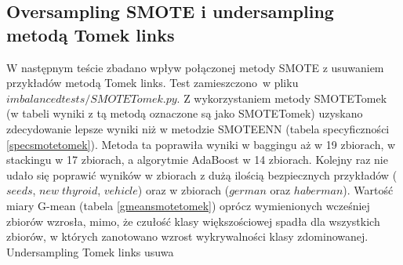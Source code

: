 \subsection{Oversampling SMOTE i undersampling metodą Tomek links}
W następnym teście zbadano wpływ połączonej metody SMOTE z usuwaniem przykładów metodą Tomek links. Test zamieszczono w pliku $imbalancedtests/SMOTETomek.py$. Z wykorzystaniem metody SMOTETomek (w tabeli wyniki z tą metodą oznaczone są jako SMOTETomek) uzyskano zdecydowanie lepsze wyniki niż w metodzie SMOTEENN (tabela specyficzności \ref{specsmotetomek}). Metoda ta poprawiła wyniki w baggingu aż w 19 zbiorach, w stackingu w 17 zbiorach, a algorytmie AdaBoost w 14 zbiorach. Kolejny raz nie udało się poprawić wyników w zbiorach z dużą ilością bezpiecznych przykładów ($seeds$, $new\; thyroid$, $vehicle$) oraz w zbiorach ($german$ oraz $haberman$). Wartość miary G-mean (tabela \ref{gmeansmotetomek}) oprócz wymienionych wcześniej zbiorów wzrosła, mimo, że czułość klasy większościowej spadła dla wszystkich zbiorów, w których zanotowano wzrost wykrywalności klasy zdominowanej. Undersampling Tomek links usuwa 
